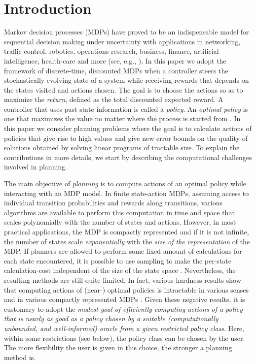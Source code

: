 \section{Introduction}
Markov decision processes (MDPs) have proved to be an indispensable model for sequential decision making under uncertainty with applications in networking, traffic control, robotics, operations research, business, finance, artificial intelligence, health-care and more (see, e.g., \cite{
White93:Apps,
rust96:book,
FeiSh02:MDPHandbook,
QiWu07,
SiBu10:MDPinAI,
BauRie:11,Puter,
LeLiu12:RLBook,
Abuetal15:MDPWireless,
BouDi17:MDPPractice}).
In this paper we adopt the framework of discrete-time, discounted MDPs when
a controller steers the stochastically evolving state of a system while receiving 
rewards that depends on the states visited and actions chosen. The goal is to choose the actions so as to maximize the \emph{return}, defined as the total discounted expected reward. A controller that uses past state information is called a \emph{policy}. An \emph{optimal policy} is one that maximizes the value no matter where the process is started from \cite{Puter}.
In this paper we consider planning problems where the goal is to calculate actions of policies that give rise to high values
 and give new error bounds on the quality of solutions obtained by solving linear programs of tractable size. 
To explain the contributions in more details, we start by describing the computational challenges involved in planning.

The main objective of \emph{planning} is to compute actions of an optimal policy while interacting with an MDP model. 
In finite state-action MDPs,
assuming access to individual transition probabilities and rewards along transitions, 
various algorithms are available to perform this computation in time and space that scales polynomially with the number of states and actions.
However, in most practical applications, the MDP is compactly represented
and if it is not infinite, the number of states scale \emph{exponentially} with the \emph{size of the representation} of the MDP.
If planners are allowed to perform some fixed amount of calculations for each state encountered,
it is possible to use sampling to make the per-state calculation-cost 
independent of the size of the state space \cite{rust96:randomization,szepesvari2001,kearns2002sparse}.
Nevertheless, the resulting methods are still quite limited. 
In fact, various hardness results show that computing actions of (near-) optimal policies is intractable in various senses
and in various compactly represented MDPs \cite{BlonTsi:00Complexity}.
Given these negative results, 
it is customary to adopt the \emph{modest goal of efficiently computing actions of a policy that 
is nearly as good as a policy chosen by a suitable (computationally unbounded, and well-informed) oracle
from a given restricted policy class}. 
Here, within some restrictions (see below), the policy class can be chosen by the user.
The more flexibility the user is given in this choice, the stronger a planning method is.

